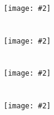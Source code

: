 \documentclass{beamer}
\newcommand{\fig}[2]{\centerline{\texttt{[image: \#2]}}}
\newcommand{\bfr}[1]{\begin{frame}[fragile]\frametitle{{ #1 }}}
\begin{document}
\bfr{}\scriptsize
\begin{verbatim}

\end{verbatim}
\fig{0.7}{quantile-lines-1.png}
\end{frame}


\bfr{}\scriptsize
\begin{verbatim}

\end{verbatim}
\fig{0.7}{quantile-lines-1.png}
\end{frame}


\bfr{}\scriptsize
\begin{verbatim}

\end{verbatim}
\fig{0.7}{quantile-lines-1.png}
\end{frame}


\bfr{}\scriptsize
\begin{verbatim}

\end{verbatim}
\fig{0.7}{quantile-lines-1.png}
\end{frame}
\end{document}
